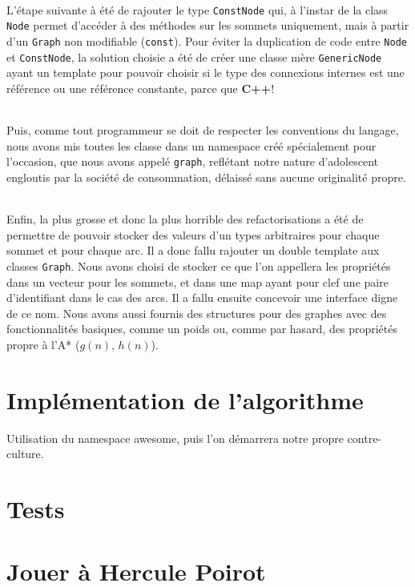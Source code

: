\documentclass[french]{article}
\begin{document}
\paragraph{} L'étape suivante à été de rajouter le type \texttt{ConstNode} qui,
à l'instar de la class \texttt{Node} permet d'accéder à des méthodes sur les
sommets uniquement, mais à partir d'un \texttt{Graph} non modifiable
(\texttt{const}). Pour éviter la duplication de code entre
\texttt{Node} et \texttt{ConstNode}, la solution choisie a été de créer une
classe mère \texttt{GenericNode} ayant un template pour pouvoir choisir si le
type des connexions internes est une référence ou une référence constante,
parce que \textbf{C++}!

\paragraph{} Puis, comme tout programmeur se doit de respecter les conventions
du langage, nous avons mis toutes les classe dans un namespace créé
spécialement pour l'occasion, que nous avons appelé \texttt{graph}, reflétant
notre nature d'adolescent engloutis par la société de consommation, délaissé
sans aucune originalité propre.

\paragraph{} Enfin, la plus grosse et donc la plus horrible des
refactorisations a été de permettre de pouvoir stocker des valeurs d'un types
arbitraires pour chaque sommet et pour chaque arc. Il a donc fallu rajouter un
double template aux classes \texttt{Graph}. Nous avons choisi de stocker ce que
l'on appellera les propriétés dans un vecteur pour les sommets, et dans une map
ayant pour clef une paire d'identifiant dans le cas des arcs. Il a fallu
ensuite concevoir une interface digne de ce nom. Nous avons aussi fournis des
structures pour des graphes avec des fonctionnalités basiques, comme un poids
ou, comme par hasard, des propriétés propre à l'A* ($g(n)$, $h(n)$).

\part{Implémentation de l'algorithme}

Utilisation du namespace awesome, puis l'on démarrera notre propre
contre-culture.

\part{Tests}

\part{Jouer à Hercule Poirot}

\printbibliography%
\end{document}
